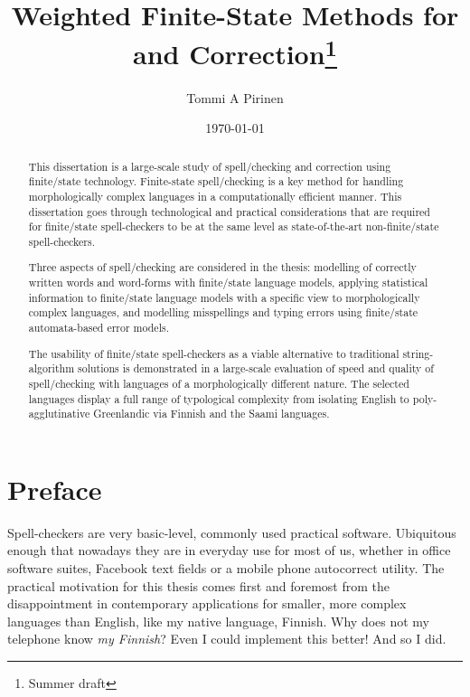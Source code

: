 \documentclass[officiallayout]{unihelcompling}
\title{Weighted Finite-State Methods for 
\misspelt{
Spell-Checking
}
and Correction\footnote{Summer draft}}
\author{Tommi A Pirinen}
\date{\today}
\begin{document}
\frontmatter

\maketitle

\begin{abstract} 
    This dissertation is a large-scale study of spell\-/checking and correction
    using finite\-/state technology. Finite-state spell\-/checking is a key method
    for handling morphologically complex languages in a computationally
    efficient manner. This dissertation goes through technological and practical
    considerations that are required for finite\-/state spell-checkers to be at
    the same level as state-of-the-art non-finite\-/state spell-checkers. 

    Three aspects of spell\-/checking are considered in the thesis: modelling of
    correctly written words and word-forms with finite\-/state language
    models, applying statistical information to finite\-/state language models
    with a specific view to morphologically complex languages, and modelling
    misspellings and typing errors using finite\-/state automata-based error
    models.

    The usability of finite\-/state spell-checkers as a viable alternative to
    traditional string-algorithm solutions is demonstrated in a large-scale
    evaluation of speed and quality of spell\-/checking with languages of
    a morphologically different nature. The selected languages display a
    full range of typological complexity from isolating English to 
    poly-agglutinative Greenlandic via Finnish and the Saami languages.
\end{abstract}

\mainmatter

\chapter*{Preface}
\label{chap:preface}

Spell-checkers are very basic-level, commonly used practical software.
Ubi\-quitous enough that nowadays they are in everyday use for most of us,
whether in office software suites, Facebook text fields or a mobile
phone autocorrect utility. The practical motivation for this thesis comes
first and foremost from the disappointment in contemporary applications for
smaller, more complex languages than English, like my native language, Finnish.
Why does not my telephone know \emph{my Finnish}? Even I could implement this
better! And so I did.
\end{document}
